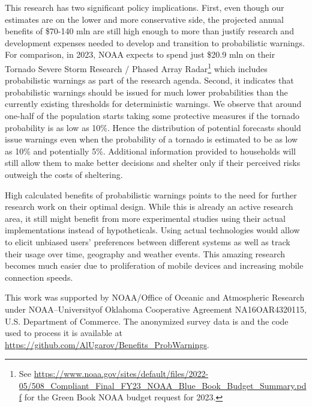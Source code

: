 \documentclass{ametsocV6.1}
\newcommand{\add}[1]{{\color{red}#1}}
\begin{document}
\add{This research has two significant policy implications. First, even though our estimates are on the lower and more conservative side, the projected annual benefits of \$70-140 mln are still high enough to more than justify research and development expenses needed to develop and transition to probabilistic warnings. For comparison, in 2023, NOAA expects to spend just \$20.9 mln on their Tornado Severe Storm Research / Phased Array Radar\footnote{See \url{https://www.noaa.gov/sites/default/files/2022-05/508_Compliant_Final_FY23_NOAA_Blue_Book_Budget_Summary.pdf} for the Green Book NOAA budget request for 2023.} which includes probabilistic warnings as part of the research agenda. Second, it indicates that probabilistic warnings should be issued for much lower probabilities than the currently existing thresholds for deterministic warnings. We observe that around one-half of the population starts taking some protective measures if the tornado probability is as low as 10\%. Hence the distribution of potential forecasts should issue warnings even when the probability of a tornado is estimated to be as low as 10\% and potentially 5\%. Additional information provided to households will still allow them to make better decisions and shelter only if their perceived risks outweigh the costs of sheltering.}

High calculated benefits of probabilistic warnings points to the need for further research work on their optimal design. While this is already an active research area, it still might benefit from more experimental studies using their actual implementations instead of hypotheticals. Using actual technologies would allow to elicit unbiased users' preferences between different systems as well as track their usage over time, geography and weather events. This amazing research becomes much easier due to proliferation of mobile devices and increasing mobile connection speeds.

\newpage


\clearpage
\acknowledgments
This work was supported by NOAA/Office of Oceanic and Atmospheric Research under NOAA–Universityof Oklahoma Cooperative Agreement NA16OAR4320115, U.S.
Department of Commerce.
% 
%
\datastatement
The anonymized survey data is and the code used to process it is available at \url{https://github.com/AlUgarov/Benefits_ProbWarnings}.
\end{document}

